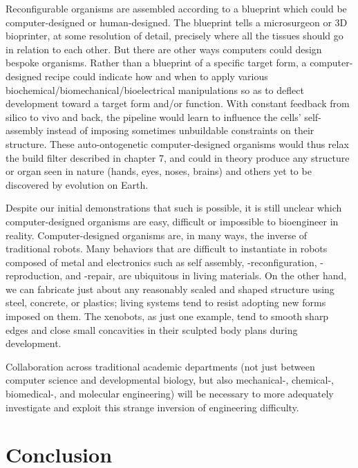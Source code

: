 Reconfigurable organisms are assembled according to a blueprint which could be computer-designed or human-designed.
The blueprint tells a microsurgeon or 3D bioprinter, at some resolution of detail, precisely where all the tissues should go in relation to each other.
But there are other ways computers could design bespoke organisms.
Rather than a blueprint of a specific target form, 
a computer-designed recipe could indicate how and when to apply various biochemical/biomechanical/bioelectrical manipulations so as to deflect development toward a target form and/or function.
With constant feedback from silico to vivo and back,
the pipeline would learn to influence the cells' self-assembly instead of imposing sometimes unbuildable constraints on their structure.
These auto-ontogenetic computer-designed organisms would thus relax the build filter described in chapter 7, and could in theory produce any structure or organ seen in nature (hands, eyes, noses, brains) and others yet to be discovered by evolution on Earth.


Despite our initial demonstrations that such is possible, 
it is still unclear which computer-designed organisms are easy, difficult or impossible to bioengineer in reality.
Computer-designed organisms are, in many ways, the inverse of traditional robots.
Many behaviors that are difficult to instantiate in robots composed of metal and electronics such as self assembly, -reconfiguration, -reproduction, and -repair, are ubiquitous in living materials.
On the other hand, we can fabricate just about any reasonably scaled and shaped structure using steel, concrete, or plastics; living systems tend to resist adopting new forms imposed on them.
The xenobots, as just one example, tend to smooth sharp edges and close small concavities in their sculpted body plans during development.

Collaboration across traditional academic departments
(not just between computer science and developmental biology, but also mechanical-, chemical-, biomedical-, and molecular engineering)
will be necessary
to more adequately investigate and exploit this strange inversion of engineering difficulty.




\section{Conclusion}


